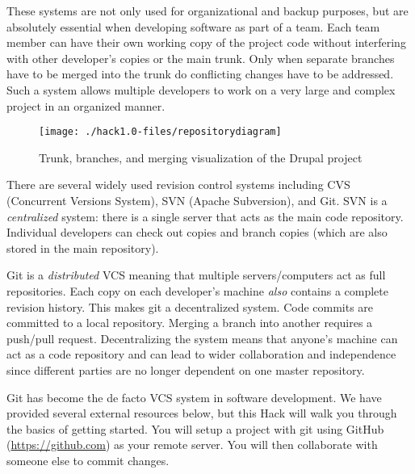 \documentclass[12pt]{scrartcl}
\begin{document}
These systems are not only used for organizational and backup 
purposes, but are absolutely essential when developing software 
as part of a team.  Each team member can have their own working 
copy of the project code without interfering with other developer's 
copies or the main trunk.  Only when separate branches have to 
be merged into the trunk do conflicting changes have to be addressed.  
Such a system allows multiple developers to work on a 
very large and complex project in an organized manner.

\begin{figure}[h]
\centering
\texttt{[image: ./hack1.0-files/repositorydiagram]}
\caption{Trunk, branches, and merging visualization of the Drupal project}
\end{figure}

There are several widely used revision control systems including 
CVS (Concurrent Versions System), SVN (Apache Subversion), and 
Git.  SVN is a \emph{centralized} system: there is a single server that 
acts as the main code repository.  Individual developers can check out 
copies and branch copies (which are also stored in the main repository).  

Git is a \emph{distributed} VCS meaning that multiple servers/computers 
act as full repositories.  Each copy on each developer's machine 
\emph{also} contains a complete revision history.  This makes git a 
decentralized system.  Code commits are committed to a local repository.  
Merging a branch into another requires a push/pull request.  
Decentralizing the system means that anyone's 
machine can act as a code repository and can lead to wider collaboration 
and independence since different parties are no longer dependent on 
one master repository.

Git has become the de facto VCS system in software development.  We have
provided several external resources below, but this Hack will walk you
through the basics of getting started.  You will setup a project with 
git using GitHub (\url{https://github.com}) as your remote server.  You
will then collaborate with someone else to commit changes.
\end{document}
